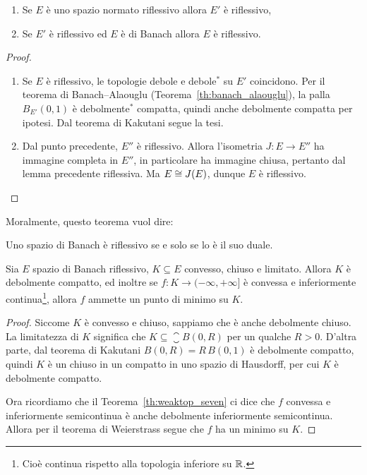 \begin{theorem}
\label{th:weaktop_eleven}
	\leavevmode
	\begin{enumerate}
		\item Se $E$ è uno spazio normato riflessivo allora $E'$ è riflessivo,
		\item Se $E'$ è riflessivo ed $E$ è di Banach allora $E$ è riflessivo.
	\end{enumerate}
\end{theorem}
\begin{proof}
	\leavevmode
	\begin{enumerate}
		\item Se $E$ è riflessivo, le topologie debole e debole$^*$ su $E'$ coincidono. Per il teorema di Banach--Alaouglu (Teorema~\ref{th:banach_alaouglu}), la palla $B_{E'}(0,1)$ è debolmente$^*$ compatta, quindi anche debolmente compatta per ipotesi. Dal teorema di Kakutani segue la tesi.

		\item Dal punto precedente, $E''$ è riflessivo. Allora l'isometria $J:E \to E''$ ha immagine completa in $E''$, in particolare ha immagine chiusa, pertanto dal lemma precedente riflessiva. Ma $E \overset{}{\cong} J(E)$, dunque $E$ è riflessivo.
	\end{enumerate}
\end{proof}

Moralmente, questo teorema vuol dire:

\begin{corollary}
	Uno spazio di Banach è riflessivo se e solo se lo è il suo duale.
\end{corollary}

\begin{theorem}
	Sia $E$ spazio di Banach riflessivo, $K \subseteq E$ convesso, chiuso e limitato.
	Allora $K$ è debolmente compatto, ed inoltre se $f:K \to (-\infty,+\infty]$ è convessa e inferiormente continua\footnote{Cioè continua rispetto alla topologia inferiore su $\mathbb{R}$.}, allora $f$ ammette un punto di minimo su $K$.
\end{theorem}
\begin{proof}
	Siccome $K$ è convesso e chiuso, sappiamo che è anche debolmente chiuso. La limitatezza di $K$ significa che $K \subseteq \closure B(0,R)$ per un qualche $R>0$. D'altra parte, dal teorema di Kakutani $B(0,R) = R\,B(0,1)$ è debolmente compatto, quindi $K$ è un chiuso in un compatto in uno spazio di Hausdorff, per cui $K$ è debolmente compatto.

	Ora ricordiamo che il Teorema~\ref{th:weaktop_seven} ci dice che $f$ convessa e inferiormente semicontinua è anche debolmente inferiormente semicontinua. Allora per il teorema di Weierstrass segue che $f$ ha un minimo su $K$.
\end{proof}

